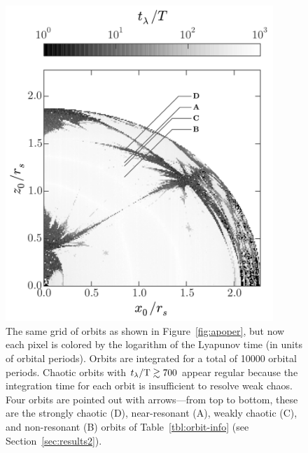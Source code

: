 \documentclass[letterpaper,12pt,preprint]{aastex}
\newcommand{\periods}{\ensuremath{{\rm T}}}
\begin{document}
\begin{figure}[p]
\begin{center}
\includegraphics[width=0.9\textwidth, trim={0 0 0 0}]{figures/lyap_map.pdf}
\caption{ The same grid of orbits as shown in Figure~\ref{fig:apoper}, but now each pixel is colored by the logarithm of the Lyapunov time (in units of orbital periods). Orbits are integrated for a total of 10000 orbital periods. Chaotic orbits with $t_\lambda/\periods \gtrsim 700$ appear regular because the integration time for each orbit is insufficient to resolve weak chaos. Four orbits are pointed out with arrows---from top to bottom, these are the strongly chaotic (D), near-resonant (A), weakly chaotic (C), and non-resonant (B) orbits of Table~\ref{tbl:orbit-info} (see Section~\ref{sec:results2}).} \label{fig:lyapmap} 
\end{center}
\end{figure}
\end{document}
